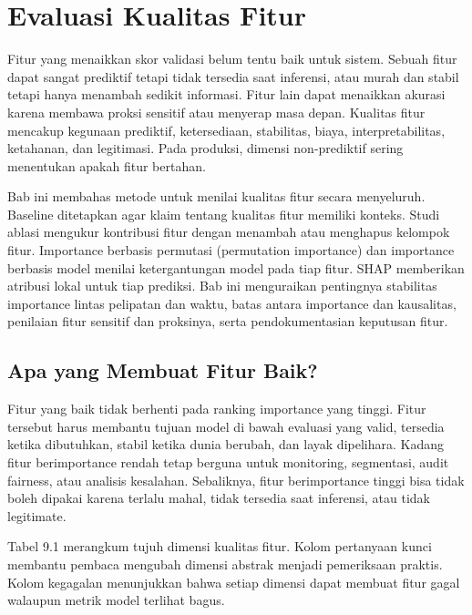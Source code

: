 \chapter{Evaluasi Kualitas Fitur}\label{evaluasi-kualitas-fitur}

Fitur yang menaikkan skor validasi belum tentu baik untuk sistem. Sebuah fitur dapat sangat prediktif tetapi tidak tersedia saat inferensi, atau murah dan stabil tetapi hanya menambah sedikit informasi. Fitur lain dapat menaikkan akurasi karena membawa proksi sensitif atau menyerap masa depan. Kualitas fitur mencakup kegunaan prediktif, ketersediaan, stabilitas, biaya, interpretabilitas, ketahanan, dan legitimasi. Pada produksi, dimensi non-prediktif sering menentukan apakah fitur bertahan.

Bab ini membahas metode untuk menilai kualitas fitur secara menyeluruh. Baseline ditetapkan agar klaim tentang kualitas fitur memiliki konteks. Studi ablasi mengukur kontribusi fitur dengan menambah atau menghapus kelompok fitur. Importance berbasis permutasi (permutation importance) dan importance berbasis model menilai ketergantungan model pada tiap fitur. SHAP memberikan atribusi lokal untuk tiap prediksi. Bab ini menguraikan pentingnya stabilitas importance lintas pelipatan dan waktu, batas antara importance dan kausalitas, penilaian fitur sensitif dan proksinya, serta pendokumentasian keputusan fitur.

\section{Apa yang Membuat Fitur Baik?}\label{apa-yang-membuat-fitur-baik}

Fitur yang baik tidak berhenti pada ranking importance yang tinggi. Fitur tersebut harus membantu tujuan model di bawah evaluasi yang valid, tersedia ketika dibutuhkan, stabil ketika dunia berubah, dan layak dipelihara. Kadang fitur berimportance rendah tetap berguna untuk monitoring, segmentasi, audit fairness, atau analisis kesalahan. Sebaliknya, fitur berimportance tinggi bisa tidak boleh dipakai karena terlalu mahal, tidak tersedia saat inferensi, atau tidak legitimate.

Tabel 9.1 merangkum tujuh dimensi kualitas fitur. Kolom pertanyaan kunci membantu pembaca mengubah dimensi abstrak menjadi pemeriksaan praktis. Kolom kegagalan menunjukkan bahwa setiap dimensi dapat membuat fitur gagal walaupun metrik model terlihat bagus.

